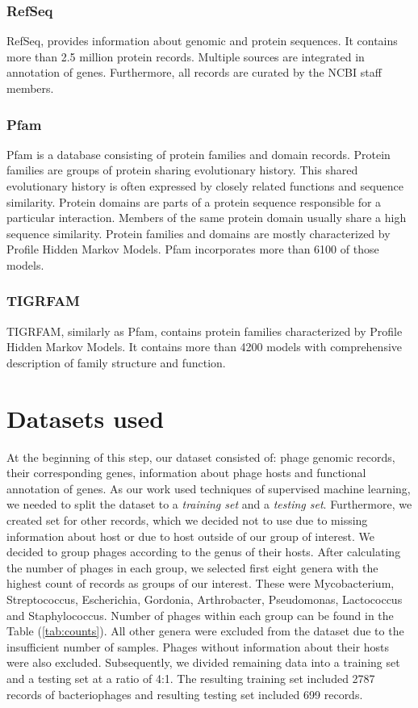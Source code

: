 \subsubsection{RefSeq}
RefSeq, provides information about genomic and protein sequences.
It contains more than 2.5 million protein records.
Multiple sources are integrated in annotation of genes.
Furthermore, all records are curated by the NCBI staff members.

\subsubsection{Pfam}
Pfam is a database consisting of protein families and domain records.
Protein families are groups of protein sharing evolutionary history.
This shared evolutionary history is often expressed by closely related functions and sequence similarity.
Protein domains are parts of a protein sequence responsible for a particular interaction. 
Members of the same protein domain usually share a high sequence similarity.
Protein families and domains are mostly characterized by Profile Hidden Markov Models.
Pfam incorporates more than 6100 of those models.

\subsubsection{TIGRFAM}
TIGRFAM, similarly as Pfam, contains protein families characterized by Profile Hidden Markov Models.
It contains more than 4200 models with comprehensive description of family structure and function.

\section{Datasets used}
At the beginning of this step, our dataset consisted of: phage genomic records, their corresponding genes, information about phage hosts and functional annotation of genes.
As our work used techniques of supervised machine learning, we needed to split the dataset to a \emph{training set} and a \emph{testing set}.
Furthermore, we created set for other records, which we decided not to use due to missing information about host or due to host outside of our group of interest.
We decided to group phages according to the genus of their hosts.
After calculating the number of phages in each group, we selected first eight genera with the highest count of records as groups of our interest.
These were Mycobacterium, Streptococcus, Escherichia, Gordonia, Arthrobacter, Pseudomonas, Lactococcus and Staphylococcus.
Number of phages within each group can be found in the Table (\ref{tab:counts}).
All other genera were excluded from the dataset due to the insufficient number of samples.
Phages without information about their hosts were also excluded.
Subsequently, we divided remaining data into a training set and a testing set at a ratio of 4:1.
The resulting training set included 2787 records of bacteriophages and resulting testing set included 699 records.


